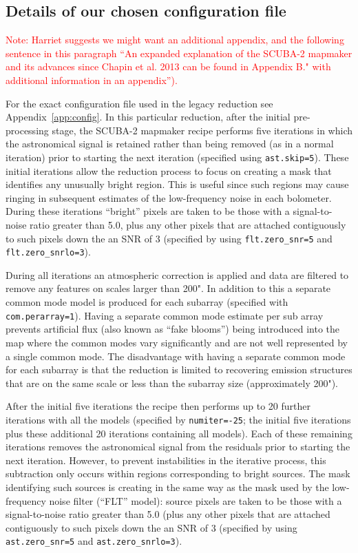 \documentclass[twocolumn,times]{aastex6}
\newcommand{\note}[1]{\textcolor{red}{Note: #1}}
\begin{document}
\subsection{Details of our chosen configuration file}

\note{Harriet suggests we might want an additional appendix, and the
  following sentence in this paragraph ``An expanded explanation of
  the SCUBA-2 mapmaker and its advances since Chapin et al. 2013 can
  be found in Appendix B." with additional information in an
  appendix'').}



For the exact configuration file used in the legacy reduction see
Appendix~\ref{app:config}. In this particular reduction, after the initial
pre-processing stage, the SCUBA-2 mapmaker recipe performs five
iterations in which the astronomical signal is retained rather than
being removed (as in a normal iteration) prior to starting the next
iteration (specified using \texttt{ast.skip=5}). These initial
iterations allow the reduction process to focus on creating a mask
that identifies any unusually bright region. This is useful since such
regions may cause ringing in subsequent estimates of the low-frequency
noise in each bolometer. During these iterations ``bright'' pixels are
taken to be those with a signal-to-noise ratio greater than 5.0, plus
any other pixels that are attached contiguously to such pixels down
the an SNR of 3 (specified by using \texttt{flt.zero\_snr=5} and
\texttt{flt.zero\_snrlo=3}).

During all iterations an atmospheric correction is applied and data
are filtered to remove any features on scales larger than 200". In
addition to this a separate common mode model is produced for each
subarray (specified with \texttt{com.perarray=1}). Having a separate
common mode estimate per sub array prevents artificial flux (also
known as ``fake blooms'') being introduced into the map where the
common modes vary significantly and are not well represented by a
single common mode. The disadvantage with having a separate common
mode for each subarray is that the reduction is limited to recovering
emission structures that are on the same scale or less than the
subarray size (approximately 200").

After the initial five iterations the recipe then performs up to 20
further iterations with all the models (specified by
\texttt{numiter=-25}; the initial five iterations plus these additional 20
iterations containing all models). Each of these remaining iterations
removes the astronomical signal from the residuals prior to starting
the next iteration. However, to prevent instabilities in the iterative
process, this subtraction only occurs within regions corresponding to
bright sources.  The mask identifying such sources is creating in the
same way as the mask used by the low-frequency noise filter (``FLT''
model): source pixels are taken to be those with a signal-to-noise
ratio greater than 5.0 (plus any other pixels that are attached
contiguously to such pixels down the an SNR of 3 (specified by using
\texttt{ast.zero\_snr=5} and \texttt{ast.zero\_snrlo=3}).
\end{document}
